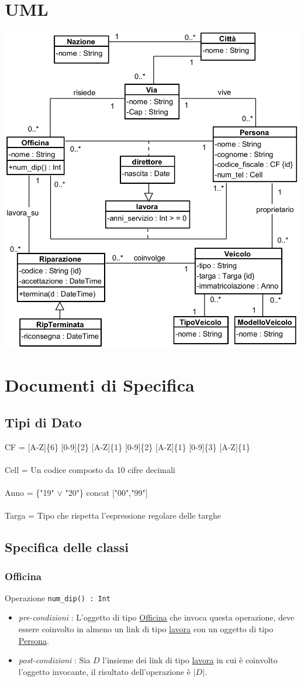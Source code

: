 \documentclass[12pt, letterpaper]{article}
\newcommand{\acc}{\\\hphantom{}\\}
\newcommand{\code}[1]{\colorbox{light-gray}{\texttt{#1}}}
\begin{document}
\section{UML}
\begin{center}
    \includegraphics[width=\textwidth]{images/UML.png}
\end{center}
\newpage
\section{Documenti di Specifica}
\subsection{Tipi di Dato}
CF = [A-Z]\{6\} [0-9]\{2\} [A-Z]\{1\} [0-9]\{2\} [A-Z]\{1\} [0-9]\{3\} [A-Z]\{1\}\acc 
Cell = Un codice composto da 10 cifre decimali\acc 
Anno = \{"19" $\lor$ "20"\} concat ["00","99"]\acc 
Targa = Tipo che rispetta l'espressione regolare delle targhe 
\subsection{Specifica delle classi}
\subsubsection{Officina}
Operazione \code{num\_dip() : Int}\begin{itemize}
    \item \textit{pre-condizioni} : L'oggetto di tipo \underline{Officina} che 
    invoca questa operazione, deve essere coinvolto in almeno un link di tipo 
    \underline{lavora} con un oggetto di tipo \underline{Persona}.
    \item \textit{post-condizioni} : Sia $D$ l'insieme dei link di tipo 
    \underline{lavora} in cui è coinvolto l'oggetto invocante, il risultato 
    dell'operazione è $|D|$.
\end{itemize}
\end{document}
